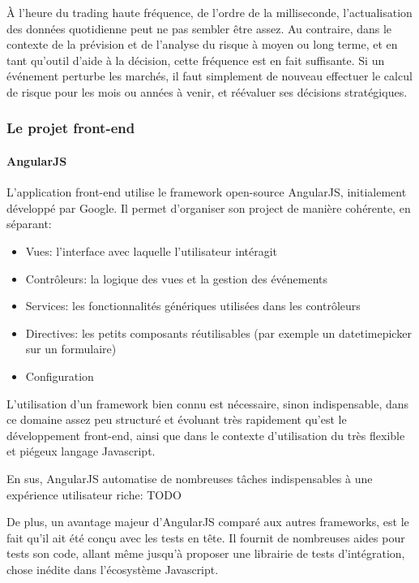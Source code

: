 \documentclass[a4paper,french,12pt]{article}
\begin{document}
	\`A l'heure du trading haute fréquence, de l'ordre de la milliseconde, l'actualisation des données quotidienne peut ne pas sembler être assez. 
	Au contraire, dans le contexte de la prévision et de l'analyse du risque à moyen ou long terme, et en tant qu'outil d'aide à la décision, cette fréquence est en fait suffisante.
	 Si un événement perturbe les marchés, il faut simplement de nouveau effectuer le calcul de risque pour les mois ou années à venir, et réévaluer ses décisions stratégiques.
	
		\subsubsection{Le projet front-end}
		
			\paragraph{AngularJS}

		L'application front-end utilise le framework open-source AngularJS, initialement développé par Google.
		Il permet d'organiser son project de manière cohérente, en séparant:
		
		\begin{itemize}
		\item Vues: l'interface avec laquelle l'utilisateur intéragit
		\item Contrôleurs: la logique des vues et la gestion des événements
		\item Services: les fonctionnalités génériques utilisées dans les contrôleurs
		\item Directives: les petits composants réutilisables (par exemple un datetimepicker sur un formulaire)
		\item Configuration
	\end{itemize}	
	
	L'utilisation d'un framework bien connu est nécessaire, sinon indispensable, dans ce domaine assez peu structuré et évoluant très rapidement qu'est le développement front-end, ainsi que dans le contexte d'utilisation du très flexible et piégeux langage Javascript.
	
	En sus, AngularJS automatise de nombreuses tâches indispensables à une expérience utilisateur riche: TODO
	
	De plus, un avantage majeur d'AngularJS comparé aux autres frameworks, est le fait qu'il ait été conçu avec les tests en tête. Il fournit de nombreuses aides pour tests son code, allant même jusqu'à proposer une librairie de tests d'intégration, chose inédite dans l'écosystème Javascript.
	
\end{document}
